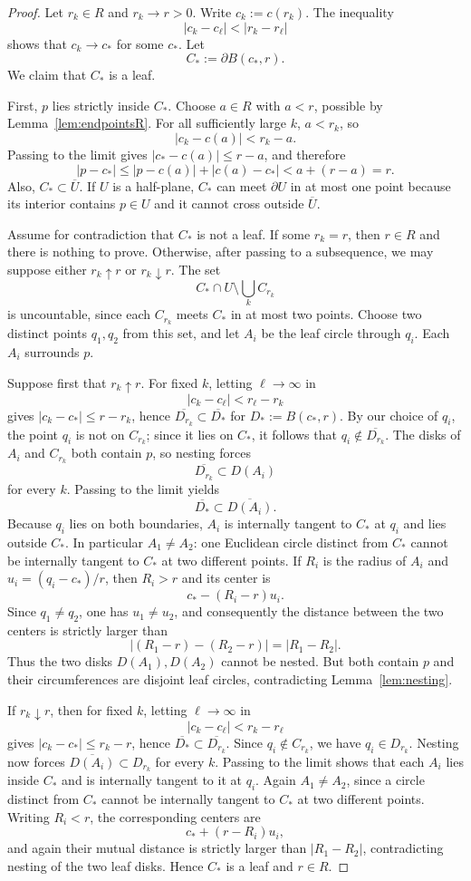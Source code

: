 \documentclass[11pt]{article}
\newcommand{\ol}{\overline}
\begin{document}
\begin{proof}
Let $r_k\in R$ and $r_k\to r>0$. Write $c_k:=c(r_k)$. The inequality
\[
|c_k-c_\ell|<|r_k-r_\ell|
\]
shows that $c_k\to c_*$ for some $c_*$. Let
\[
C_*:=\partial B(c_*,r).
\]
We claim that $C_*$ is a leaf.

First, $p$ lies strictly inside $C_*$. Choose $a\in R$ with $a<r$, possible by Lemma~\ref{lem:endpointsR}. For all sufficiently large $k$, $a<r_k$, so
\[
|c_k-c(a)|<r_k-a.
\]
Passing to the limit gives $|c_*-c(a)|\le r-a$, and therefore
\[
|p-c_*|\le |p-c(a)|+|c(a)-c_*|<a+(r-a)=r.
\]
Also, $C_*\subset\ol U$. If $U$ is a half-plane, $C_*$ can meet $\partial U$ in at most one point because its interior contains $p\in U$ and it cannot cross outside $\ol U$.

Assume for contradiction that $C_*$ is not a leaf. If some $r_k=r$, then $r\in R$ and there is nothing to prove. Otherwise, after passing to a subsequence, we may suppose either $r_k\uparrow r$ or $r_k\downarrow r$. The set
\[
C_*\cap U\setminus\bigcup_k C_{r_k}
\]
is uncountable, since each $C_{r_k}$ meets $C_*$ in at most two points. Choose two distinct points $q_1,q_2$ from this set, and let $A_i$ be the leaf circle through $q_i$. Each $A_i$ surrounds $p$.

Suppose first that $r_k\uparrow r$. For fixed $k$, letting $\ell\to\infty$ in
\[
|c_k-c_\ell|<r_\ell-r_k
\]
gives $|c_k-c_*|\le r-r_k$, hence $\ol{D_{r_k}}\subset\ol{D_*}$ for $D_*:=B(c_*,r)$. By our choice of $q_i$, the point $q_i$ is not on $C_{r_k}$; since it lies on $C_*$, it follows that $q_i\notin\ol{D_{r_k}}$. The disks of $A_i$ and $C_{r_k}$ both contain $p$, so nesting forces
\[
\ol{D_{r_k}}\subset D(A_i)
\]
for every $k$. Passing to the limit yields
\[
\ol{D_*}\subset\ol{D(A_i)}.
\]
Because $q_i$ lies on both boundaries, $A_i$ is internally tangent to $C_*$ at $q_i$ and lies outside $C_*$. In particular $A_1\ne A_2$: one Euclidean circle distinct from $C_*$ cannot be internally tangent to $C_*$ at two different points. If $R_i$ is the radius of $A_i$ and $u_i=(q_i-c_*)/r$, then $R_i>r$ and its center is
\[
c_*-(R_i-r)u_i.
\]
Since $q_1\ne q_2$, one has $u_1\ne u_2$, and consequently the distance between the two centers is strictly larger than
\[
|(R_1-r)-(R_2-r)|=|R_1-R_2|.
\]
Thus the two disks $D(A_1),D(A_2)$ cannot be nested. But both contain $p$ and their circumferences are disjoint leaf circles, contradicting Lemma~\ref{lem:nesting}.

If $r_k\downarrow r$, then for fixed $k$, letting $\ell\to\infty$ in
\[
|c_k-c_\ell|<r_k-r_\ell
\]
gives $|c_k-c_*|\le r_k-r$, hence $\ol{D_*}\subset\ol{D_{r_k}}$. Since $q_i\notin C_{r_k}$, we have $q_i\in D_{r_k}$. Nesting now forces $\ol{D(A_i)}\subset D_{r_k}$ for every $k$. Passing to the limit shows that each $A_i$ lies inside $C_*$ and is internally tangent to it at $q_i$. Again $A_1\ne A_2$, since a circle distinct from $C_*$ cannot be internally tangent to $C_*$ at two different points. Writing $R_i<r$, the corresponding centers are
\[
c_*+(r-R_i)u_i,
\]
and again their mutual distance is strictly larger than $|R_1-R_2|$, contradicting nesting of the two leaf disks. Hence $C_*$ is a leaf and $r\in R$.
\end{proof}
\end{document}
